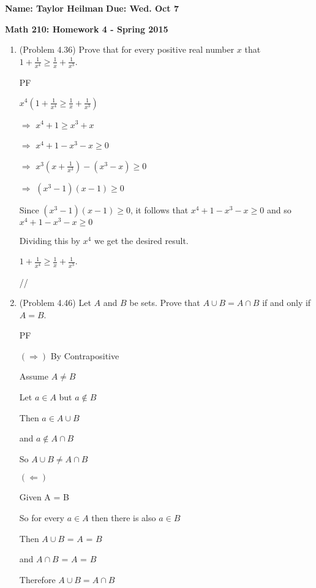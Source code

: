 \documentclass[12pt]{article}
\begin{document}
\textbf{Name: Taylor Heilman}    \hspace{4in} \textbf{Due: Wed. Oct 7}
\begin{center} \textbf{Math 210: Homework 4 - Spring 2015} \end{center}

\begin{enumerate}

\item (Problem 4.36)  Prove that for every positive real number $x$ that $1+ \frac{1}{x^4} \geq \frac{1}{x} + \frac{1}{x^3}$.

{PF

${x^4} (1+ \frac{1}{x^4} \geq \frac{1}{x} + \frac{1}{x^3})$

$\Rightarrow$  ${x^4} + 1 \geq {x^3} + x$

$\Rightarrow$ ${x^4} + 1 - {x^3} - x \geq 0$

$\Rightarrow$ ${x^3} (x + \frac{1}{x^3})-({x^3} - x)   \geq 0$

$\Rightarrow$ $({x^3}-1)({x-1})  \geq 0$

Since  $({x^3}-1)({x - 1})  \geq 0$, it follows that ${x^4} + 1 - {x^3} - x \geq 0$ and so ${x^4} + 1 - {x^3} - x \geq 0$

Dividing this by  ${x^4}$ we get the desired  result.

 $1+ \frac{1}{x^4} \geq \frac{1}{x} + \frac{1}{x^3}$.





//
}
\item (Problem 4.46) Let $A$ and $B$ be sets.  Prove that $A \cup B = A \cap B$ if and only if $A = B$.

{PF

$(\Rightarrow)$ By Contrapositive

Assume $A \neq  B$

Let $a \in A$ but $a \notin B$

Then $a \in A \cup B$

and $a \notin A \cap B$

So  $A \cup B \neq A \cap B$ 

$(\Leftarrow)$

Given A = B

So for every $a \in A$ then there is also $a \in B$

Then $A \cup B$ = $A$ = $B$

and $A \cap B$ = $A$ = $B$

Therefore $A \cup B = A \cap B$




}
\end{enumerate}
\end{document}
